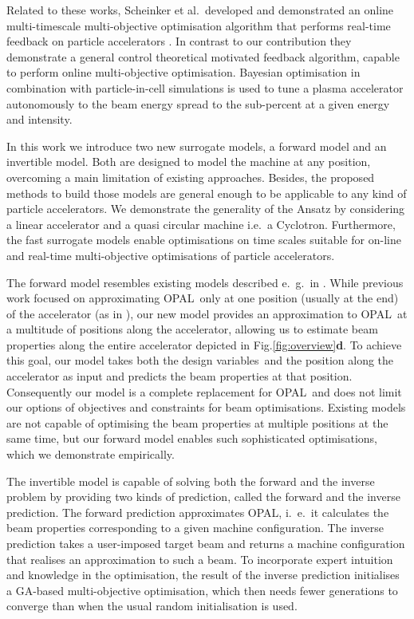 \documentclass[a4paper, 12pt, version-1-compatibility]{article}
\def\opal{OPAL}
\def\dvars{design variables}
\newcommand{\figref}[1]{Fig.\xspace\ref{#1}}
\begin{document}
Related to these works, Scheinker et al.\ developed and demonstrated an online multi-timescale multi-objective optimisation algorithm that performs real-time feedback on particle accelerators \cite{doi:10.1063/5.0003423}. In contrast to our contribution they demonstrate a general control theoretical motivated feedback algorithm, capable to perform online multi-objective optimisation. Bayesian optimisation in combination  with particle-in-cell simulations \cite{PhysRevLett.126.104801} is used to tune a plasma accelerator autonomously to the beam energy spread to the sub-percent at a given energy and intensity. 

In this work we introduce two new surrogate models, a forward model and an invertible model. Both are designed to  model the machine at any position, overcoming a main limitation of existing approaches. Besides, the proposed methods to build those models are general enough to be applicable to any kind of particle accelerators. We demonstrate the generality of the Ansatz by considering a linear accelerator and a quasi circular machine i.e.\ a Cyclotron. Furthermore, the fast surrogate models enable optimisations on time scales suitable for on-line and real-time multi-objective optimisations of particle accelerators.





The forward model resembles existing models described e.\ g.\ in \cite{ml_speedup}. While previous work focused on approximating \opal\ only at one position (usually at the end) of the accelerator (as in \cite{ml_speedup}), our new model provides an approximation to \opal\ at a multitude of positions along the accelerator, allowing us to estimate beam properties along the entire accelerator depicted in \figref{fig:overview}\textbf{d}. To achieve this goal, our model takes both the \dvars\ and the position along the accelerator as input and predicts the beam properties at that position. Consequently our model is a complete replacement for \opal\ and does not limit our options of objectives and constraints for beam optimisations. Existing models are not capable of optimising the beam properties at multiple positions at the same time, but our forward model enables such sophisticated optimisations, which we demonstrate empirically.

The invertible model is capable of solving both the forward and the inverse problem by providing two kinds of prediction, called the forward and the inverse prediction. The forward prediction approximates \opal, i.\ e.\ it calculates the beam properties corresponding to a given machine configuration. The inverse prediction takes a user-imposed target beam and returns a machine configuration that realises an approximation to such a beam.
To incorporate expert intuition and knowledge in the optimisation, the result of the inverse prediction initialises a GA-based multi-objective optimisation, which then needs fewer generations to converge than when the usual random initialisation is used.
\end{document}
